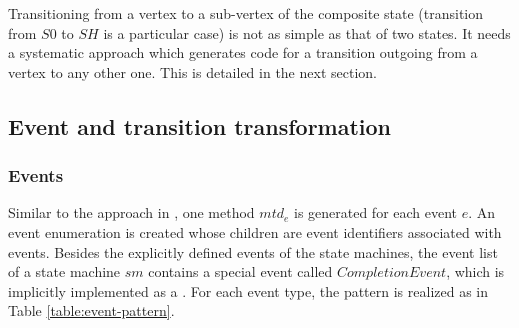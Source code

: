 Transitioning from a vertex to a sub-vertex of the composite state (transition from $S0$ to $SH$ is a particular case) is not as simple as that of two states. It needs a systematic approach which generates code for a transition outgoing from a vertex to any other one. This is detailed in the next section.

\subsection{Event and transition transformation}
\label{subsec:event}
\subsubsection{Events}

Similar to the approach in \cite{niaz_mapping_2004}, one method $mtd_e$ is generated for each event $e$. 
An event enumeration  is created whose children are event identifiers associated with events. 
Besides the explicitly defined events of the state machines, the event list of a state machine $sm$ contains a special event called $CompletionEvent$, which is implicitly implemented as a . %
For each event type, the pattern is realized as in Table \ref{table:event-pattern}.



